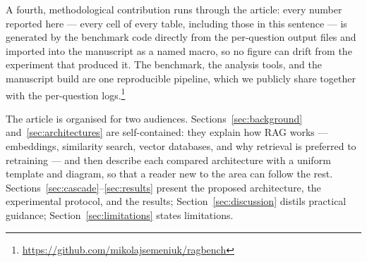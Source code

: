 A fourth, methodological contribution runs through the article: every
number reported here --- every cell of every table, including those in this
sentence --- is generated by the benchmark code directly from the
per-question output files and imported into the manuscript as a named
macro, so no figure can drift from the experiment that produced it. The
benchmark, the analysis tools, and the manuscript build are one
reproducible pipeline, which we publicly share together with the per-question
logs.\footnote{\url{https://github.com/mikolajsemeniuk/ragbench}}

The article is organised for two audiences. Sections~\ref{sec:background}
and~\ref{sec:architectures} are self-contained: they explain how RAG works
--- embeddings, similarity search, vector databases, and why retrieval is
preferred to retraining --- and then describe each compared architecture
with a uniform template and diagram, so that a reader new to the area can
follow the rest. Sections~\ref{sec:cascade}--\ref{sec:results} present the
proposed architecture, the experimental protocol, and the results;
Section~\ref{sec:discussion} distils practical guidance;
Section~\ref{sec:limitations} states limitations.
